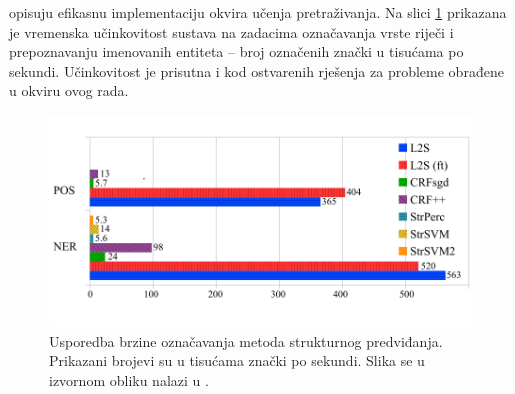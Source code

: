 \citet{daume14lts} opisuju efikasnu implementaciju okvira učenja pretraživanja.
Na slici \ref{fig:ltsperf} prikazana je vremenska učinkovitost sustava na
zadacima označavanja vrste riječi i prepoznavanju imenovanih entiteta -- broj označenih
znački u tisućama po sekundi. Učinkovitost je prisutna i kod ostvarenih rješenja
za probleme obrađene u okviru ovog rada.

\begin{figure}
  \centering
  \includegraphics[scale=0.9]{tokenposec.pdf}
  \caption[Usporedba brzine označavanja metoda strukturnog
  predviđanja.]{Usporedba brzine označavanja metoda strukturnog predviđanja.
  Prikazani brojevi su u tisućama znački po sekundi. Slika se u izvornom obliku
  nalazi u \citep{ltsicmltutorial}.}
  \label{fig:ltsperf}
\end{figure}
